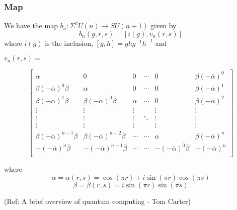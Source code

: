  \begin{frame}[fragile]\frametitle{Map}


We have the map
	$ b_n: \Sigma^2U(n) \rightarrow SU(n+1) $ \newline
given by
	\[ b_n(g, r, s) = \left[ i(g), v_n(r, s) \right] \]
where $i(g)$ is the inclusion,
	$\left[g, h\right] = ghg^{-1}h^{-1}$ \newline
and

$ v_n(r,s) = $

{\small
\[
\left[ \begin{array}{cccccc}
	\alpha & 0 & 0 & \cdots & 0 & \beta (-\overline{\alpha})^0 \\
	\beta (-\overline{\alpha})^0\overline{\beta} &
	   \alpha  &  0  & \cdots & 0 &
	   \beta (-\overline{\alpha})^1 \\
	\beta (-\overline{\alpha})^1\overline{\beta} &
	   \beta (-\overline{\alpha})^0\overline{\beta} &
	   \alpha & \cdots & 0 & \beta (-\overline{\alpha})^2 \\
	\vdots & \vdots & \vdots &  & \vdots & \vdots \\
	\vdots & \vdots & \vdots & \ddots & \vdots & \vdots \\
	\vdots & \vdots & \vdots &  & \vdots & \vdots \\
	\beta (-\overline{\alpha})^{n-1}\overline{\beta} &
	   \beta (-\overline{\alpha})^{n-2}\overline{\beta} &
	   \cdots &  \cdots & \alpha &
	   \beta (-\overline{\alpha})^n \\
	-(-\overline{\alpha})^n\overline{\beta} &
	   -(-\overline{\alpha})^{n-1}\overline{\beta} &
	   \cdots &  \cdots & -(-\overline{\alpha})^0 
	   \overline{\beta} & -(-\overline{\alpha})^n \\
	\end{array} \right]
\]
}

{\small
where
\[ \alpha = \alpha(r,s) =
	\cos(\pi r) + i \sin(\pi r)\cos(\pi s) \]
\[ \beta = \beta(r,s) = i \sin(\pi r)\sin(\pi s) \]
}

\tiny{(Ref: A brief overview of quantum computing - Tom Carter)}

\end{frame}




